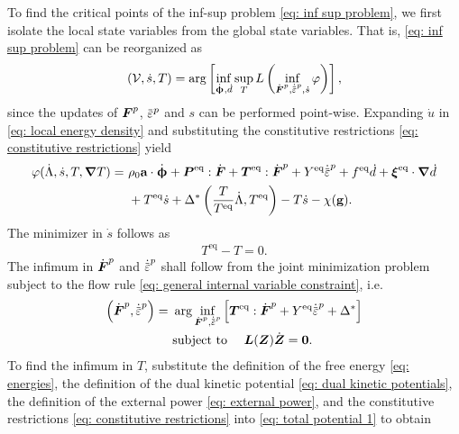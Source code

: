To find the critical points of the inf-sup problem \eqref{eq: inf sup problem}, we first isolate the local state variables from the global state variables. That is, \eqref{eq: inf sup problem} can be reorganized as
\begin{align}
    \left( \mathcal{V}, \dot{s}, T \right) = \arg \left[ \inf_{\defrate, \dot{d}} \sup_T L\left( \inf_{\dot{\defgrad}^p, \epdot, \dot{s}} \varphi \right) \right],
\end{align}
since the updates of $\boldsymbol{F}^p$, $\ep$ and $s$ can be performed point-wise. Expanding $\dot{u}$ in \eqref{eq: local energy density} and substituting the constitutive restrictions \eqref{eq: constitutive restrictions} yield
\begin{equation}
\begin{aligned}
    \varphi(\dot{\Lambda}, \dot{s}, T, \grad T) =&\ \rho_0\bta\cdot\defrate + \bfP^\text{eq}:\dot{\defgrad} + \bfT^\text{eq}:\dot{\defgrad}^p + Y^\text{eq}\epdot + f^\text{eq}\dot{d} + \bs{\xi}^\text{eq}\cdot\grad\dot{d} \\
    &\ + T^\text{eq}\dot{s} + \Delta^*\left( \dfrac{T}{T^\text{eq}}\dot{\Lambda}, T^\text{eq} \right) - T\dot{s} - \chi(\btg).
\end{aligned}
\end{equation}
The minimizer in $\dot{s}$ follows as
\begin{align}
    T^\text{eq} - T = 0.
\end{align}
The infimum in $\dot{\boldsymbol{F}}^p$ and $\epdot$ shall follow from the joint minimization problem subject to the flow rule \eqref{eq: general internal variable constraint}, i.e.
\begin{equation}
\begin{aligned}
    \left( \dot{\defgrad}^p, \epdot \right) = &\ \arg\inf_{\dot{\defgrad}^p, \epdot} \left[ \bfT^\text{eq}:\dot{\defgrad}^p + Y^\text{eq}\epdot + \Delta^* \right] \\
    &\ \text{subject to }\quad \bfL(\bfZ)\dot{\bfZ} = \bs{0}.
\end{aligned}
\end{equation}
To find the infimum in $T$, substitute the definition of the free energy \eqref{eq: energies}, the definition of the dual kinetic potential \eqref{eq: dual kinetic potentials}, the definition of the external power \eqref{eq: external power}, and the constitutive restrictions \eqref{eq: constitutive restrictions} into \eqref{eq: total potential 1} to obtain
